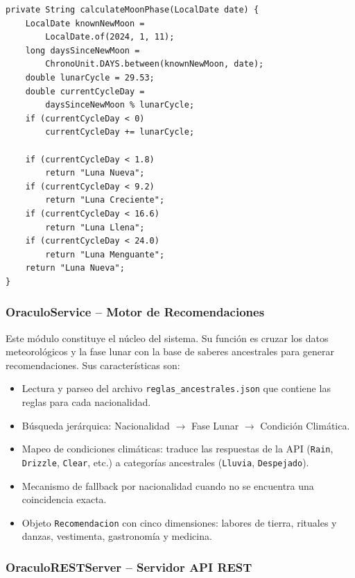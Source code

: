 \documentclass[conference]{IEEEtran}
\begin{document}
\begin{lstlisting}[caption={Algoritmo de cálculo de fase lunar}]
private String calculateMoonPhase(LocalDate date) {
    LocalDate knownNewMoon =
        LocalDate.of(2024, 1, 11);
    long daysSinceNewMoon =
        ChronoUnit.DAYS.between(knownNewMoon, date);
    double lunarCycle = 29.53;
    double currentCycleDay =
        daysSinceNewMoon % lunarCycle;
    if (currentCycleDay < 0)
        currentCycleDay += lunarCycle;

    if (currentCycleDay < 1.8)
        return "Luna Nueva";
    if (currentCycleDay < 9.2)
        return "Luna Creciente";
    if (currentCycleDay < 16.6)
        return "Luna Llena";
    if (currentCycleDay < 24.0)
        return "Luna Menguante";
    return "Luna Nueva";
}
\end{lstlisting}

\subsubsection{OraculoService -- Motor de Recomendaciones}

Este módulo constituye el núcleo del sistema. Su función es cruzar los datos meteorológicos y la fase lunar con la base de saberes ancestrales para generar recomendaciones. Sus características son:

\begin{itemize}
    \item Lectura y parseo del archivo \texttt{reglas\_ancestrales.json} que contiene las reglas para cada nacionalidad.
    \item Búsqueda jerárquica: Nacionalidad $\rightarrow$ Fase Lunar $\rightarrow$ Condición Climática.
    \item Mapeo de condiciones climáticas: traduce las respuestas de la API (\texttt{Rain}, \texttt{Drizzle}, \texttt{Clear}, etc.) a categorías ancestrales (\texttt{Lluvia}, \texttt{Despejado}).
    \item Mecanismo de fallback por nacionalidad cuando no se encuentra una coincidencia exacta.
    \item Objeto \texttt{Recomendacion} con cinco dimensiones: labores de tierra, rituales y danzas, vestimenta, gastronomía y medicina.
\end{itemize}

\subsubsection{OraculoRESTServer -- Servidor API REST}
\end{document}
